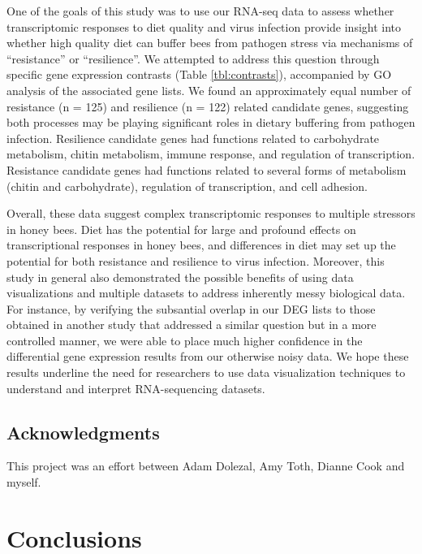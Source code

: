 \documentclass[11pt,a4paper,oldfontcommands,openany]{memoir}
\numberwithin{equation}{section} %
\begin{document}
One of the goals of this study was to use our RNA-seq data to assess whether transcriptomic responses to diet quality and virus infection provide insight into whether high quality diet can buffer bees from pathogen stress via mechanisms of ``resistance'' or ``resilience''. We attempted to address this question through specific gene expression contrasts (Table \ref{tbl:contrasts}), accompanied by GO analysis of the associated gene lists. We found an approximately equal number of resistance (n = 125) and resilience (n = 122) related candidate genes, suggesting both processes may be playing significant roles in dietary buffering from pathogen infection. Resilience candidate genes had functions related to carbohydrate metabolism, chitin metabolism, immune response, and regulation of transcription. Resistance candidate genes had functions related to several forms of metabolism (chitin and carbohydrate), regulation of transcription, and cell adhesion.  

Overall, these data suggest complex transcriptomic responses to multiple stressors in honey bees. Diet has the potential for large and profound effects on transcriptional responses in honey bees, and differences in diet may set up the potential for both resistance and resilience to virus infection. Moreover, this study in general also demonstrated the possible benefits of using data visualizations and multiple datasets to address inherently messy biological data. For instance, by verifying the subsantial overlap in our DEG lists to those obtained in another study that addressed a similar question but in a more controlled manner, we were able to place much higher confidence in the differential gene expression results from our otherwise noisy data. We hope these results underline the need for researchers to use data visualization techniques to understand and interpret RNA-sequencing datasets.

\section{Acknowledgments}

This project was an effort between Adam Dolezal, Amy Toth, Dianne Cook and myself.


\chapter{Conclusions}
\end{document}

